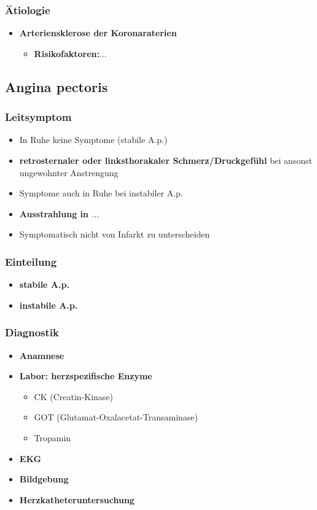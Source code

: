 	\subsubsection{Ätiologie}
		\begin{itemize}
			\item \textbf{Arteriensklerose der Koronaraterien}
				\begin{itemize}
					\item \textbf{Risikofaktoren:$\dots$}
				\end{itemize}
		\end{itemize}
\subsection{Angina pectoris}
	\subsubsection{Leitsymptom}
		\begin{itemize}
			\item In Ruhe keine Symptome (stabile A.p.)
			\item \textbf{retrosternaler oder linksthorakaler Schmerz/Druckgefühl} bei ansonst ungewohnter Anstrengung
			\item Symptome auch in Ruhe bei instabiler A.p.
			\item \textbf{Ausstrahlung in $\dots$}
			\item Symptomatisch nicht von Infarkt zu unterscheiden
		\end{itemize}
	\subsubsection{Einteilung}
		\begin{itemize}
			\item \textbf{stabile A.p.}
			\item \textbf{instabile A.p.}
		\end{itemize}
	\subsubsection{Diagnostik}
		\begin{itemize}
			\item \textbf{Anamnese}
			\item \textbf{Labor: herzspezifische Enzyme}
				\begin{itemize}
					\item CK (Creatin-Kinase)
					\item GOT (Glutamat-Oxalacetat-Transaminase)
					\item Tropamin
				\end{itemize}
			\item \textbf{EKG}
			\item \textbf{Bildgebung}
			\item \textbf{Herzkatheteruntersuchung}
		\end{itemize}
